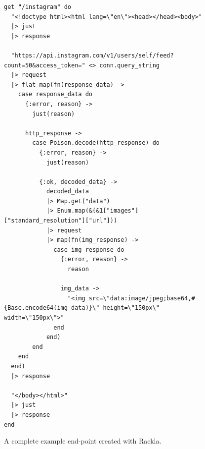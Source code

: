 \documentclass{cslthse-msc}
\begin{document}
\begin{figure}[H]
  \centering
\begin{lstlisting}[breaklines=true,frame=single]
get "/instagram" do
  "<!doctype html><html lang=\"en\"><head></head><body>"
  |> just
  |> response

  "https://api.instagram.com/v1/users/self/feed?count=50&access_token=" <> conn.query_string
  |> request
  |> flat_map(fn(response_data) ->
    case response_data do
      {:error, reason} ->
        just(reason)
        
      http_response ->
        case Poison.decode(http_response) do
          {:error, reason} ->
            just(reason)
            
          {:ok, decoded_data} ->
            decoded_data
            |> Map.get("data")
            |> Enum.map(&(&1["images"]["standard_resolution"]["url"]))
            |> request
            |> map(fn(img_response) ->
              case img_response do
                {:error, reason} ->
                  reason
                  
                img_data ->
                  "<img src=\"data:image/jpeg;base64,#{Base.encode64(img_data)}\" height=\"150px\" width=\"150px\">"
              end
            end)
        end
    end
  end)
  |> response
  
  "</body></html>"
  |> just
  |> response
end
\end{lstlisting}
  \caption{A complete example end-point created with Rackla.}
  \label{fig:complete_end_point}
\end{figure}
\end{document}
